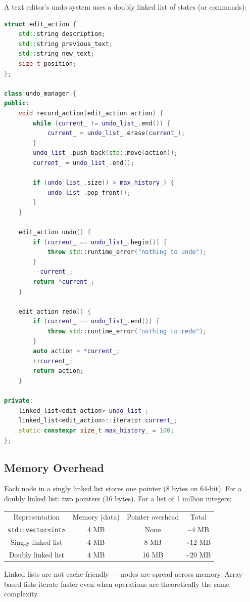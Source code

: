 A text editor's undo system uses a doubly linked list of states (or commands):

\begin{lstlisting}[language=C++]
struct edit_action {
    std::string description;
    std::string previous_text;
    std::string new_text;
    size_t position;
};

class undo_manager {
public:
    void record_action(edit_action action) {
        while (current_ != undo_list_.end()) {
            current_ = undo_list_.erase(current_);
        }
        undo_list_.push_back(std::move(action));
        current_ = undo_list_.end();

        if (undo_list_.size() > max_history_) {
            undo_list_.pop_front();
        }
    }

    edit_action undo() {
        if (current_ == undo_list_.begin()) {
            throw std::runtime_error("nothing to undo");
        }
        --current_;
        return *current_;
    }

    edit_action redo() {
        if (current_ == undo_list_.end()) {
            throw std::runtime_error("nothing to redo");
        }
        auto action = *current_;
        ++current_;
        return action;
    }

private:
    linked_list<edit_action> undo_list_;
    linked_list<edit_action>::iterator current_;
    static constexpr size_t max_history_ = 100;
};
\end{lstlisting}

\subsection{Memory Overhead}

Each node in a singly linked list stores one pointer (8 bytes on 64-bit). For a doubly linked list: two pointers (16 bytes). For a list of 1 million integers:

\begin{center}
\begin{tabular}{cccc}
\toprule
Representation & Memory (data) & Pointer overhead & Total \\
\texttt{std::vector<int>} & 4 MB & None & \textasciitilde{}4 MB \\
Singly linked list & 4 MB & 8 MB & \textasciitilde{}12 MB \\
Doubly linked list & 4 MB & 16 MB & \textasciitilde{}20 MB \\

\bottomrule
\end{tabular}
\end{center}
Linked lists are not cache-friendly — nodes are spread across memory. Array-based lists iterate faster even when operations are theoretically the same complexity.


